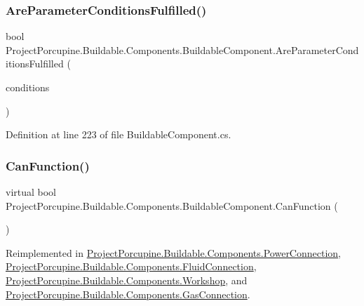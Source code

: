 \subsubsection{\texorpdfstring{Are\+Parameter\+Conditions\+Fulfilled()}{AreParameterConditionsFulfilled()}}
{\footnotesize\ttfamily bool Project\+Porcupine.\+Buildable.\+Components.\+Buildable\+Component.\+Are\+Parameter\+Conditions\+Fulfilled (\begin{DoxyParamCaption}\item[{List$<$ \hyperlink{class_project_porcupine_1_1_buildable_1_1_components_1_1_buildable_component_1_1_parameter_condition}{Parameter\+Condition} $>$}]{conditions }\end{DoxyParamCaption})\hspace{0.3cm}{\ttfamily [protected]}}



Definition at line 223 of file Buildable\+Component.\+cs.

\mbox{\label{class_project_porcupine_1_1_buildable_1_1_components_1_1_buildable_component_a589203e44ce8de22262caead43ad38d6}} 
\subsubsection{\texorpdfstring{Can\+Function()}{CanFunction()}}
{\footnotesize\ttfamily virtual bool Project\+Porcupine.\+Buildable.\+Components.\+Buildable\+Component.\+Can\+Function (\begin{DoxyParamCaption}{ }\end{DoxyParamCaption})\hspace{0.3cm}{\ttfamily [virtual]}}



Reimplemented in \hyperlink{class_project_porcupine_1_1_buildable_1_1_components_1_1_power_connection_ae0c98f5109191531858d433295a99841}{Project\+Porcupine.\+Buildable.\+Components.\+Power\+Connection}, \hyperlink{class_project_porcupine_1_1_buildable_1_1_components_1_1_fluid_connection_a8f3e90619dd04d8adc149e2d24ebf31a}{Project\+Porcupine.\+Buildable.\+Components.\+Fluid\+Connection}, \hyperlink{class_project_porcupine_1_1_buildable_1_1_components_1_1_workshop_a1b478ecd3ba6d1229dd851d1ce9d1a7e}{Project\+Porcupine.\+Buildable.\+Components.\+Workshop}, and \hyperlink{class_project_porcupine_1_1_buildable_1_1_components_1_1_gas_connection_a12332ec93cb8ad81b48f5b362810c281}{Project\+Porcupine.\+Buildable.\+Components.\+Gas\+Connection}.



